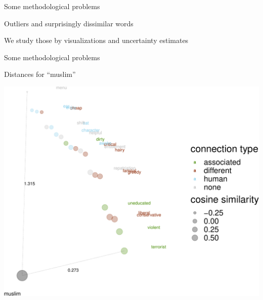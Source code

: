 \documentclass[10pt,ignorenonframetext,x11names, dvipsnames, bibspacing,natbib]{beamer}
\begin{document}
\begin{frame}{Some methodological problems}
\protect\hypertarget{some-methodological-problems-2}{}

\begin{block}{Outliers and surprisingly dissimilar words}

We study those by visualizations and uncertainty estimates

\end{block}

\end{frame}

\begin{frame}{Some methodological problems}
\protect\hypertarget{some-methodological-problems-3}{}

\begin{block}{Distances for ``muslim''}

\begin{center}\includegraphics[width=0.8\linewidth]{presentationESSLLI_files/figure-beamer/unnamed-chunk-4-1} \end{center}

\end{block}

\end{frame}
\end{document}

